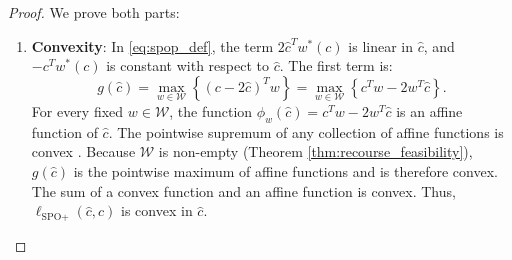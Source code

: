 \documentclass[11pt,a4paper]{article}
\theoremstyle{definition}
\theoremstyle{remark}
\begin{document}
\begin{proof}
We prove both parts:
\begin{enumerate}[label=\textbf{Part \arabic*.},wide=0pt]
    \item \textbf{Convexity}: In \eqref{eq:spop_def}, the term $2\hat{c}^T w^*(c)$ is linear in $\hat{c}$, and $-c^T w^*(c)$ is constant with respect to $\hat{c}$. The first term is:
    \begin{equation*}
        g(\hat{c}) = \max_{w \in \mathcal{W}} \left\{ (c - 2\hat{c})^T w \right\} = \max_{w \in \mathcal{W}} \left\{ c^T w - 2 w^T \hat{c} \right\}.
    \end{equation*}
    For every fixed $w \in \mathcal{W}$, the function $\phi_w(\hat{c}) = c^T w - 2 w^T \hat{c}$ is an affine function of $\hat{c}$. The pointwise supremum of any collection of affine functions is convex \citep{boyd2004convex}. Because $\mathcal{W}$ is non-empty (Theorem \ref{thm:recourse_feasibility}), $g(\hat{c})$ is the pointwise maximum of affine functions and is therefore convex. The sum of a convex function and an affine function is convex. Thus, $\ell_{\text{SPO}+}(\hat{c}, c)$ is convex in $\hat{c}$.


\end{enumerate}
\end{proof}
\end{document}

